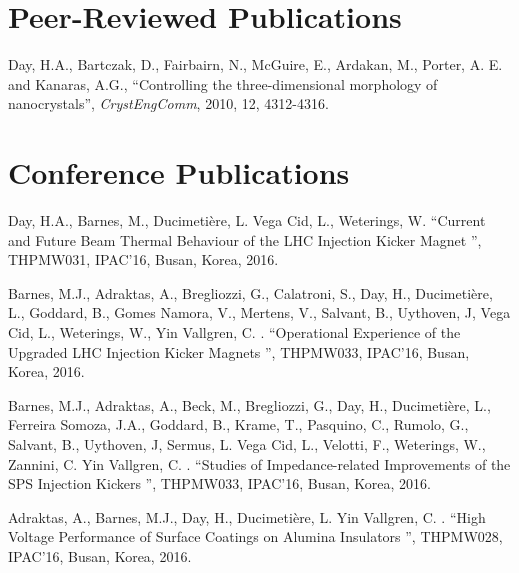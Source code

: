 \documentclass[margin,line]{resume}
\begin{document}
\begin{resume}
    \section{\mysidestyle Peer-Reviewed Publications}

    
	Day, H.A.,  Bartczak, D.,  Fairbairn, N.,  McGuire, E., Ardakan, M., Porter, A. E. and Kanaras, A.G.,
    ``Controlling the three-dimensional morphology of nanocrystals'',
    \textsl{CrystEngComm}, 2010, 12, 4312-4316.

\vspace{-2mm}


    \section{\mysidestyle Conference Publications}

    
	Day, H.A., Barnes, M., Ducimetière, L. Vega Cid, L., Weterings, W.    ``Current and Future Beam Thermal Behaviour of the LHC Injection Kicker Magnet '',
    THPMW031, IPAC'16, Busan, Korea, 2016.

\vspace{-2mm}

	 Barnes, M.J., Adraktas, A., Bregliozzi, G., Calatroni, S., Day, H., Ducimetière, L., Goddard, B., Gomes Namora, V., Mertens, V., Salvant, B., Uythoven, J, Vega Cid, L., Weterings, W.,
Yin Vallgren, C. .    ``Operational Experience of the Upgraded LHC Injection Kicker Magnets '',
    THPMW033, IPAC'16, Busan, Korea, 2016.

\vspace{-2mm}

	 Barnes, M.J., Adraktas, A., Beck, M., Bregliozzi, G., Day, H., Ducimetière, L., Ferreira Somoza, J.A., Goddard, B., Krame, T., Pasquino, C., Rumolo, G., Salvant, B., Uythoven, J, Sermus, L. Vega Cid, L., Velotti, F., Weterings, W., Zannini, C.
Yin Vallgren, C. .    ``Studies of Impedance-related Improvements of the SPS Injection Kickers '',
    THPMW033, IPAC'16, Busan, Korea, 2016.

\vspace{-2mm}

	 Adraktas, A., Barnes, M.J., Day, H., Ducimetière, L. Yin Vallgren, C. .    ``High Voltage Performance of Surface Coatings on Alumina Insulators '',
    THPMW028, IPAC'16, Busan, Korea, 2016.


\end{resume}
\end{document}
